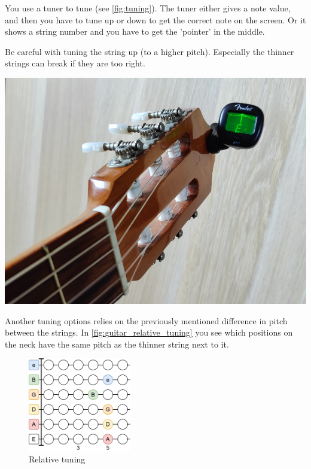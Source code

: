 \begin{minipage}{0.5\textwidth}
You use a tuner to tune (see \autoref{fig:tuning}). The tuner either gives a note value, and then you have to tune up or down to get the correct note on the screen. Or it shows a string number and you have to get the 'pointer' in the middle.

Be careful with tuning the string up (to a higher pitch). Especially the thinner strings can break if they are too right.
\end{minipage}
\hfill
\begin{minipage}{0.3\textwidth}
    \centering
    \includegraphics[width=\textwidth]{../../Images/guitar-tuning.jpg}
    \label{fig:tuning}
\end{minipage}

Another tuning options relies on the previously mentioned difference in pitch between the strings. In \autoref{fig:guitar_relative_tuning} you see which positions on the neck have the same pitch as the thinner string next to it.

\begin{figure}[h]
    \centering
    \includegraphics[width=0.4\textwidth]{../../Images/GuitarRelativeTuning.png}
    \caption{Relative tuning}
    \label{fig:guitar_relative_tuning}
\end{figure}
